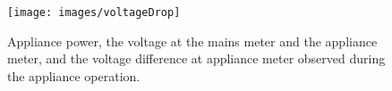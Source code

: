 \begin{figure} 
	\centering
	\texttt{[image: images/voltageDrop]}
	\caption[Appliance power, the voltage at the mains meter and the appliance meter, and the voltage difference at appliance meter observed during the appliance operation.]{Appliance power, the voltage at the mains meter and the appliance meter, and the voltage difference at appliance meter observed during the appliance operation.}
	\label{fig:voltageDrop}
\end{figure}
